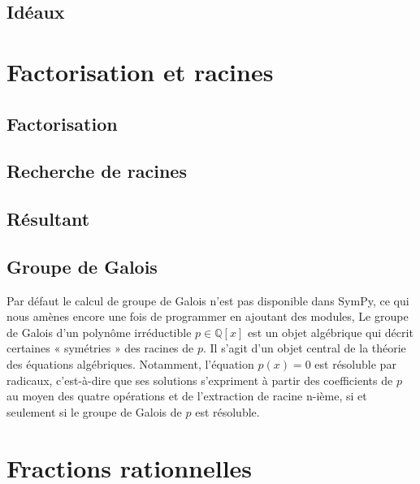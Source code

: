  \subsection{Idéaux}
 \section{ Factorisation et racines}
 \subsection{Factorisation}
 \subsection{ Recherche de racines}
 \subsection{ R\'esultant}
 \subsection{ Groupe de Galois}
 Par défaut le calcul de groupe de Galois n'est pas disponible dans SymPy, ce qui nous amènes encore
 une fois de programmer en ajoutant des modules, Le groupe de Galois d’un polynôme irréductible $p \in \mathbb{Q}\left[x\right]$ est un objet algébrique qui décrit certaines « symétries » des racines de $p$. Il s’agit d’un objet central de la théorie des équations algébriques. Notamment, l’équation $p\left(x\right) = 0$
est résoluble par radicaux, c’est-à-dire que ses solutions s’expriment à partir des coefficients de $p$ au moyen des quatre opérations et de l'extraction de racine n-ième, si et seulement si le groupe de Galois de $p$ est résoluble.
\section{ Fractions rationnelles}
